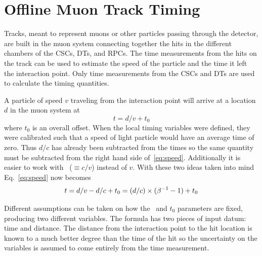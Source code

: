 \section{Offline Muon Track Timing}

Tracks, meant to represent muons or other particles passing through the detector, are built in the muon system connecting together the hits in the different chambers of
the CSCs, DTs, and RPCs. The time measurements from the hits on the track can be used to estimate the speed of the particle and the time it left the interaction point.
Only time measurements from the CSCs and DTs are used to calculate the timing quantities.

A particle of speed $v$ traveling from the interaction point will arrive at a location $d$ in the muon system at
\begin{equation}
t = d/v + t_0
\label{eq:speed}
\end{equation}
where $t_0$ is an overall offset. When the local timing variables were defined, they were calibrated such that a speed of light particle would have an average time
of zero. Thus $d/c$ has already been subtracted from the times so the same quantity must be subtracted from the right hand side of~\ref{eq:speed}.
Additionally it is easier to work with \invbeta\ ($\equiv{c/v}$) instead of $v$. With these two ideas taken into mind Eq.~\ref{eq:speed} now becomes
\begin{equation}
t = d/v - d/c + t_0 = (d / c) \times (\beta^{-1} - 1) + t_0 \\
\label{eq:speedred}
\end{equation}

Different assumptions can be taken on how the \invbeta\ and $t_0$ parameters are fixed, producing two different variables.
The formula has two pieces of input datum: time and distance. The distance
from the interaction point to the hit location is known to a much better degree than the time of the hit so the uncertainty on the variables
is assumed to come entirely from the time measurement.

